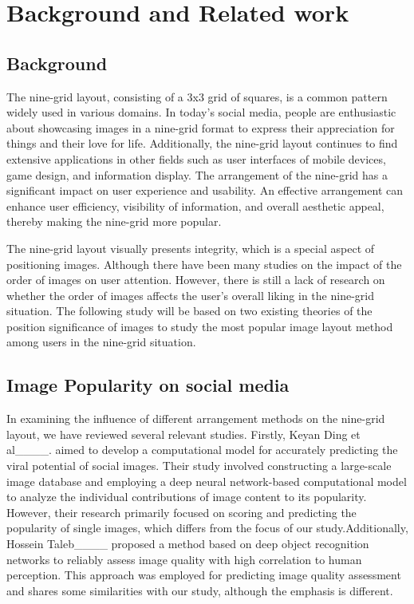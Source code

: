 \section{Background and Related work}
\subsection{Background}

The nine-grid layout, consisting of a 3x3 grid of squares, is a common pattern widely used in various domains. In today's social media, people are enthusiastic about showcasing images in a nine-grid format to express their appreciation for things and their love for life. Additionally, the nine-grid layout continues to find extensive applications in other fields such as user interfaces of mobile devices, game design, and information display. The arrangement of the nine-grid has a significant impact on user experience and usability. An effective arrangement can enhance user efficiency, visibility of information, and overall aesthetic appeal, thereby making the nine-grid more popular. 

The nine-grid layout visually presents integrity, which is a special aspect of positioning images. Although there have been many studies on the impact of the order of images on user attention. However, there is still a lack of research on whether the order of images affects the user's overall liking in the nine-grid situation. The following study will be based on two existing theories of the position significance of images to study the most popular image layout method among users in the nine-grid situation.

\subsection{Image Popularity on social media}

In examining the influence of different arrangement methods on the nine-grid layout, we have reviewed several relevant studies. Firstly, Keyan Ding et al____. aimed to develop a computational model for accurately predicting the viral potential of social images. Their study involved constructing a large-scale image database and employing a deep neural network-based computational model to analyze the individual contributions of image content to its popularity. However, their research primarily focused on scoring and predicting the popularity of single images, which differs from the focus of our study.Additionally, Hossein Taleb____ proposed a method based on deep object recognition networks to reliably assess image quality with high correlation to human perception. This approach was employed for predicting image quality assessment and shares some similarities with our study, although the emphasis is different.

